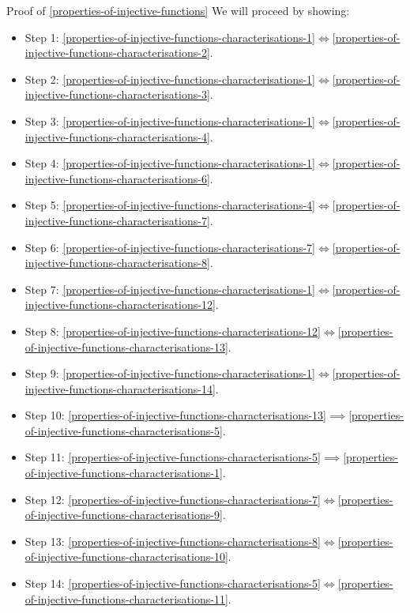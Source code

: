 \begin{Proof}{Proof of \cref{properties-of-injective-functions}}%
    We will proceed by showing:
    \begin{itemize}
        \item Step 1: \cref{properties-of-injective-functions-characterisations-1}$\iff$\cref{properties-of-injective-functions-characterisations-2}.
        \item Step 2: \cref{properties-of-injective-functions-characterisations-1}$\iff$\cref{properties-of-injective-functions-characterisations-3}.
        \item Step 3: \cref{properties-of-injective-functions-characterisations-1}$\iff$\cref{properties-of-injective-functions-characterisations-4}.
        \item Step 4: \cref{properties-of-injective-functions-characterisations-1}$\iff$\cref{properties-of-injective-functions-characterisations-6}.
        \item Step 5: \cref{properties-of-injective-functions-characterisations-4}$\iff$\cref{properties-of-injective-functions-characterisations-7}.
        \item Step 6: \cref{properties-of-injective-functions-characterisations-7}$\iff$\cref{properties-of-injective-functions-characterisations-8}.
        \item Step 7: \cref{properties-of-injective-functions-characterisations-1}$\iff$\cref{properties-of-injective-functions-characterisations-12}.
        \item Step 8: \cref{properties-of-injective-functions-characterisations-12}$\iff$\cref{properties-of-injective-functions-characterisations-13}.
        \item Step 9: \cref{properties-of-injective-functions-characterisations-1}$\iff$\cref{properties-of-injective-functions-characterisations-14}.
        \item Step 10: \cref{properties-of-injective-functions-characterisations-13}$\implies$\cref{properties-of-injective-functions-characterisations-5}.
        \item Step 11: \cref{properties-of-injective-functions-characterisations-5}$\implies$\cref{properties-of-injective-functions-characterisations-1}.
        \item Step 12: \cref{properties-of-injective-functions-characterisations-7}$\iff$\cref{properties-of-injective-functions-characterisations-9}.
        \item Step 13: \cref{properties-of-injective-functions-characterisations-8}$\iff$\cref{properties-of-injective-functions-characterisations-10}.
        \item Step 14: \cref{properties-of-injective-functions-characterisations-5}$\iff$\cref{properties-of-injective-functions-characterisations-11}.
    \end{itemize}


\end{Proof}
